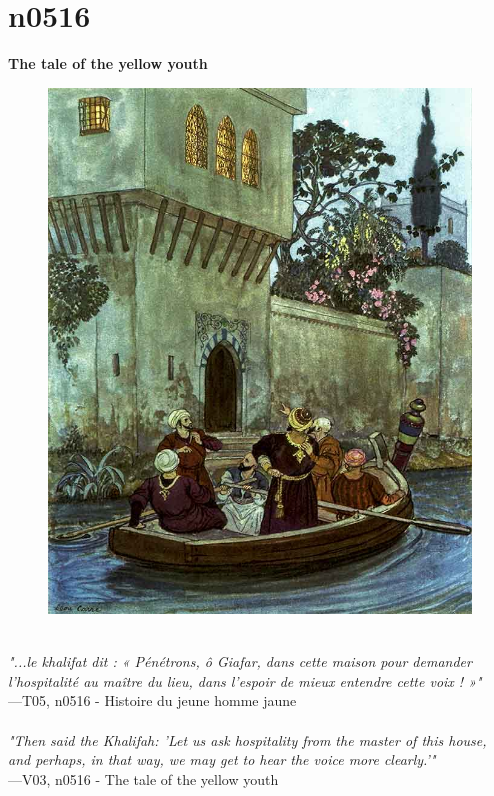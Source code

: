 \documentclass[../Carre_nights.tex]{subfiles}
\begin{document}
\newpage

\section{n0516}
\textbf{\Large{The tale of the yellow youth}} \\

\begin{figure}[ht]
\centering
\includegraphics[height=\figsize]{illustrations/volume_5/T05, n0516 - Histoire du jeune homme jaune.jpg}
\end{figure}

\textit{\\
"...le khalifat dit : « Pénétrons, ô Giafar, dans cette maison pour demander l’hospitalité au maître du lieu, dans l’espoir de mieux entendre cette voix ! »"} \\
—T05, n0516 - Histoire du jeune homme jaune \\~\\
\textit{"Then said the Khalifah: 'Let us ask hospitality from the master of this house, and perhaps, in that way, we may get to hear the voice more clearly.'"} \\
—V03, n0516 - The tale of the yellow youth
\end{document}
